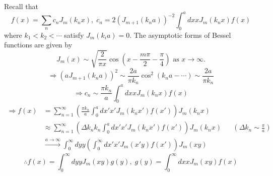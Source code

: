 \item

Recall that
\[
    f(x) = \sum_n c_n J_m(k_n x),\;
    c_n = 2 {\left( J_{m + 1}(k_n a) \right)}^{-2}
          \int_0^a dx xJ_m(k_n x) f(x)
\]
where $k_1 < k_2 < \cdots$ satisfy $J_m(k_i a) = 0$.
The asymptotic forms of Bessel functions are given by
\[
    J_m(x) \sim \sqrt{\frac{2}{\pi x}} \cos\left(
        x - \frac{m\pi}{2} - \frac{\pi}{4}
    \right)
    \text{ as } x \rightarrow \infty.
\]
\[
    \Rightarrow {\left( aJ_{m + 1}(k_n a) \right)}^2
    \sim \frac{2a}{\pi k_n} \cos^2 \left( k_n a - \cdots \right)
    \sim \frac{2a}{\pi k_n}
\]
\[
    \Rightarrow c_n
    \sim \frac{\pi k_n}{a} \int_0^a dx xJ_m(k_n x) f(x)
\]
\begin{align*}
    \Rightarrow f(x)
    &= \sum_{n = 1}^\infty \left(
        \frac{\pi k_n}{a} \int_0^a dx' x' J_m(k_n x') f(x')
    \right) J_m(k_n x) \\
    &\approx \sum_{n = 1}^\infty \left(
        \Delta k_n k_n \int_0^a dx' x' J_m(k_n x') f(x')
    \right) J_m(k_n x)
    && \left( \Delta k_n \sim \frac{\pi}{a} \right) \\
    &\xrightarrow{a \rightarrow \infty} \int_0^\infty dy y \left(
        \int_0^\infty dx' x' J_m(x'y) f(x')
    \right) J_m(xy)
\end{align*}
\[
    \therefore f(x) = \int_0^\infty dy y J_m(xy) g(y),\;
    g(y) = \int_0^\infty dx x J_m(xy) f(x)
\]
